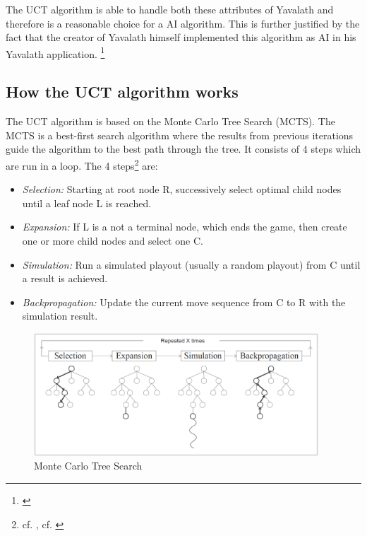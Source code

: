 \documentclass[german]{report}
\begin{document}
The UCT algorithm is able to handle both these attributes of Yavalath and
therefore is a reasonable choice for a AI algorithm. This is further justified
by the fact that the creator of Yavalath himself implemented this algorithm as
AI in his Yavalath application. \footnote{\cite{yvalath}}\\

\subsection{How the UCT algorithm works}

The UCT algorithm is based on the Monte Carlo Tree Search (MCTS). The MCTS is a
best-first search algorithm where the results from previous iterations guide the
algorithm to the best path through the tree. It consists of 4 steps which are
run in a loop. The 4 steps\footnote{cf. \cite{mcts}, cf. \cite{wiki:mcts}} are:
\begin{itemize}
	\item \textit{Selection:} Starting at root node R, successively select optimal child nodes until a leaf node L is reached.
	\item \textit{Expansion:}  If L is a not a terminal node, which ends the game, then create one or more child nodes and select one C.
	\item \textit{Simulation:}  Run a simulated playout (usually a random playout) from C until a result is achieved.
	\item \textit{Backpropagation:}  Update the current move sequence from C to R with the simulation result.
\end{itemize}

\begin{figure}[ht]
\centering
\includegraphics[width=0.95\textwidth]{Abbildungen/MonteCarloTreeSearch.png}
\caption[Monte Carlo Tree Search, Source:\cite{paper:mcts}]{Monte Carlo Tree Search}
\label{fig:yav_winChance}
\end{figure}
\end{document}
